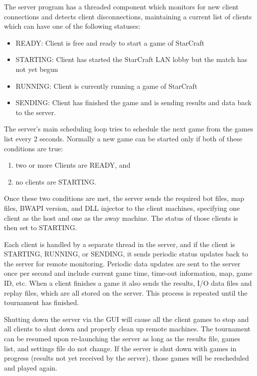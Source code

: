 The server program has a threaded component which monitors for new client connections and detects client disconnections, maintaining a current list of clients which can have one of the following statuses:

\begin{itemize}
\item READY: Client is free and ready to start a game of StarCraft
\item STARTING: Client has started the StarCraft LAN lobby but the match has not yet begun
\item RUNNING: Client is currently running a game of StarCraft
\item SENDING: Client has finished the game and is sending results and data back to the server.
\end{itemize}

The server's main scheduling loop tries to schedule the next game from the games list every 2 seconds. Normally a new game can be started only if both of these conditions are true:

\begin{enumerate}
\item two or more Clients are READY, and
\item no clients are STARTING.
\end{enumerate}

\noindent Once these two conditions are met, the server sends the required bot files, map files, BWAPI version, and DLL injector to the client machines, specifying one client as the host and one as the away machine. The status of those clients is then set to STARTING.

Each client is handled by a separate thread in the server, and if the client is STARTING, RUNNING, or SENDING, it sends periodic status updates back to the server for remote monitoring. Periodic data updates are sent to the server once per second and include current game time, time-out information, map, game ID, etc. When a client finishes a game it also sends the results, I/O data files and replay files, which are all stored on the server. This process is repeated until the tournament has finished.

Shutting down the server via the GUI will cause all the client games to stop and all clients to shut down and properly clean up remote machines. The tournament can be resumed upon re-launching the server as long as the results file, games list, and settings file do not change. If the server is shut down with games in progress (results not yet received by the server), those games will be rescheduled and played again.

